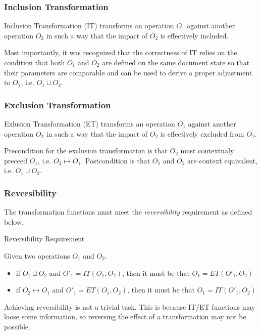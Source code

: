 \documentclass[11pt,a4paper]{article}
\begin{document}
\subsubsection{Inclusion Transformation}
Inclusion Transformation (IT) transforms an operation $O_{1}$ against another operation $O_{2}$ in such a way that the impact of $O_{2}$ is effectively included. 

Most importantly, it was recognized that the correctness of IT relies on the condition that both $O_{1}$ and $O_{2}$ are defined on the same document state so that their parameters are comparable and can be used to derive a proper adjustment to $O_{2}$, i.e. $O_{1} \sqcup O_{2}$.

\subsubsection{Exclusion Transformation}
Exlusion Transformation (ET) transforms an operation $O_{1}$ against another operation $O_{2}$ in such a way that the impact of $O_{2}$ is effectively excluded from $O_{1}$.

Precondition for the exclusion transformation is that $O_{2}$ must contextualy preceed $O_{1}$, i.e. $O_{2} \mapsto O_{1}$. Postcondition is that $O_{1}$ and $O_{2}$ are context equivalent, i.e. $O_{1} \sqcup O_{2}$. 

\subsubsection{Reversibility}
The transformation functions must meet the \emph{reversibility} requirement as defined below.

\begin{defn}
Reversibility Requirement
\end{defn}

Given two operations $O_{1}$ and $O_{2}$.

\begin{itemize}
 \item if $O_{1} \sqcup O_{2}$ and $O'_{1} = IT(O_{1},O_{2})$, then it must
       be that $O_{1} = ET(O'_{1},O_{2})$
 \item if $O_{2} \mapsto O_{1}$ and $O'_{1} = ET(O_{1},O_{2})$, then it must
       be that $O_{1} = IT(O'_{1},O_{2})$
\end{itemize}

Achieving reversibility is not a trivial task. This is because IT/ET functions may loose some information, so reversing the effect of a transformation may not be possible.
\end{document}
